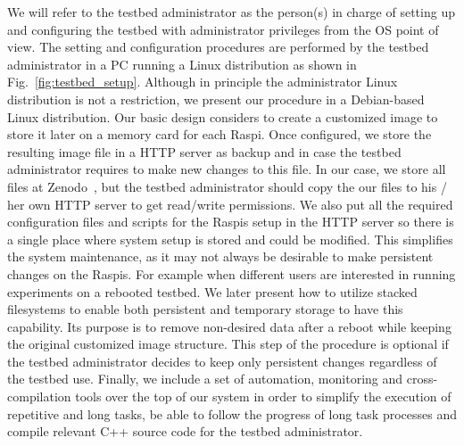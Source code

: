 We will refer to the
testbed administrator as the person(s) in charge of setting up and
configuring the testbed with administrator privileges from the \ac{OS}
point of view. The setting and configuration procedures are
performed by the testbed administrator in a \ac{PC} running a
Linux distribution as shown in Fig.~\ref{fig:testbed_setup}. Although in principle the administrator
Linux distribution is not a restriction, we present our procedure in a
Debian-based Linux distribution. Our basic design considers to create
a customized image to store it later on a memory card for each \ac{Raspi}.
Once configured, we store the resulting image file in a \ac{HTTP} server
as backup and in case the testbed administrator requires to make new
changes to this file.
In our case, we store all files at Zenodo~\cite{soerensen_chres_wiant_2016_154143}, but the testbed administrator should copy the our files to his / her own \ac{HTTP} server to get read/write permissions.
We also put all the required
configuration files and scripts for the \ac{Raspi}s setup in the \ac{HTTP}
server so there is a single place where system setup is stored and could be
modified. This simplifies the system maintenance, as it may not always be desirable to make persistent changes
on the \ac{Raspi}s. For example when different users are interested in
running experiments on a rebooted testbed. We later present how
to utilize stacked filesystems to enable both persistent and
temporary storage to have this capability. Its purpose is to
remove non-desired data after a reboot while keeping the original
customized image structure. This step of the procedure is optional if
the testbed administrator decides to keep only persistent changes regardless
of the testbed use. Finally, we include a set of automation, monitoring
and cross-compilation tools over the top of our system in order to simplify
the execution of repetitive and long tasks, be able to follow the progress
of long task processes and compile relevant C++ source code for the testbed
administrator.


